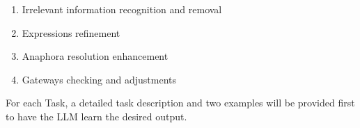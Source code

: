 \begin{enumerate}
    \item Irrelevant information recognition and removal
    \item Expressions refinement
    \item Anaphora resolution enhancement
    \item Gateways checking and adjustments
\end{enumerate}

For each Task, a detailed task description and two examples will be provided first to have the LLM learn the desired output. 













